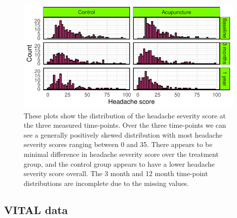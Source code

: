 \documentclass{article}
\newcommand{\pandocbounded}[1]{#1}
\begin{document}
\begin{figure}
\centering
\pandocbounded{\includegraphics[keepaspectratio]{Final_Report_files/figure-latex/unnamed-chunk-11-1.pdf}}
\caption{These plots show the distribution of the headache severity
score at the three measured time-points. Over the three time-points we
can see a generally positively skewed distribution with most headache
severity scores ranging between 0 and 35. There appears to be minimal
difference in headache severity score over the treatment group, and the
control group appears to have a lower headache severity score overall.
The 3 month and 12 month time-point distributions are incomplete due to
the missing values.}
\end{figure}

\subsection{VITAL data}\label{vital-data}
\end{document}
